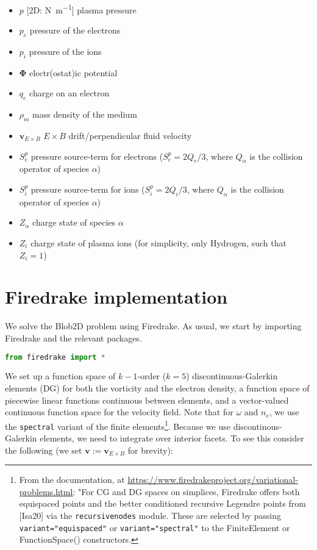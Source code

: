\documentclass{article}
\begin{document}
\begin{itemize}
    \item $p$ [2D: \unit{\newton\per\metre}] plasma pressure
    \item $p_e$ pressure of the electrons
    \item $p_i$ pressure of the ions
    \item $\bm{\Phi}$ electr(ostat)ic potential
    \item $q_e$ charge on an electron
    \item $\rho_m$ mass density of the medium
    \item $\bm{v}_{E \times B}$ $E \times B$ drift/perpendicular fluid velocity
    \item $S_e^p$ pressure source-term for electrons ($S_e^p = 2Q_e/3$, where $Q_\alpha$ is the collision operator of species $\alpha$)
    \item $S_i^p$ pressure source-term for ions ($S_i^p = 2Q_i/3$, where $Q_\alpha$ is the collision operator of species $\alpha$)
    \item $Z_\alpha$ charge state of species $\alpha$
    \item $Z_i$ charge state of plasma ions (for simplicity, only Hydrogen, such that $Z_i = 1$)
\end{itemize}

\section{Firedrake implementation}

We solve the Blob2D problem using Firedrake. As usual, we start by importing Firedrake and the relevant packages.

\begin{lstlisting}[language=Python]
from firedrake import *
\end{lstlisting}

We set up a function space of $k-1$-order ($k = 5$) discontinuous-Galerkin elements (DG) for both the vorticity and the electron density, a function space of piecewise linear functions continuous between elements, and a vector-valued continuous function space for the velocity field. Note that for $\omega$ and $n_e$, we use the \texttt{spectral} variant of the finite elements\footnote{From the documentation, at \url{https://www.firedrakeproject.org/variational-problems.html}: "For CG and DG spaces on simplices, Firedrake offers both equispaced points and the better conditioned recursive Legendre points from [Isa20] via the \texttt{recursivenodes} module. These are selected by passing \texttt{variant="equispaced"} or \texttt{variant="spectral"} to the FiniteElement or FunctionSpace() constructors.}. Because we use discontinous-Galerkin elements, we need to integrate over interior facets. To see this consider the following (we set $\bm{v} := \bm{v}_{E \times B}$ for brevity):
\end{document}
